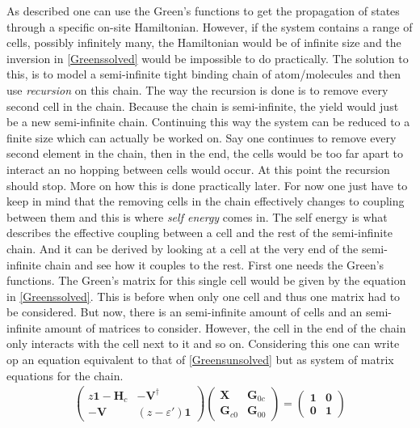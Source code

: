 As described  one can use the Green's functions to get the propagation of states through a specific on-site Hamiltonian. However, if the system contains a range of cells, possibly infinitely many, the Hamiltonian would be of infinite size and the inversion in \cref{Greenssolved} would be impossible to do practically. The solution to this, is to model a semi-infinite tight binding chain of atom/molecules and then use \textit{recursion} on this chain. The way the recursion is done is to remove every second cell in the chain. Because the chain is semi-infinite, the yield would just be a new semi-infinite chain. Continuing this way the system can be reduced to a finite size which can actually be worked on. Say one continues to remove every second element in the chain, then in the end, the cells would be too far apart to interact an no hopping between cells would occur. At this point the recursion should stop. More on how this is done practically later.  For now one just have to keep in mind that the removing cells in the chain effectively changes to coupling between them and this is where \textit{self energy} comes in. The self energy is what describes the effective coupling between a cell and the rest of the semi-infinite chain. And it can be derived by looking at a cell at the very end of the semi-infinite chain and see how it couples to the rest. First one needs the Green's functions. The Green's matrix for this single cell would be given by the equation in \cref{Greenssolved}. This is before when only one cell and thus one matrix had to be considered. But now, there is an semi-infinite amount of cells and an semi-infinite amount of matrices to consider. However, the cell in the end of the chain only interacts with the cell next to it and so on. Considering this one can write op an equation equivalent to that of \cref{Greensunsolved} but as system of matrix equations for the chain.
\begin{align}\label{Greenssystem}
	\begin{pmatrix}
		z\mathbf{1}-\mathbf{H}_c & -\mathbf{V}^{\dagger} \\ -\mathbf{V} & (z-\varepsilon')\mathbf{1}
	\end{pmatrix}
	\begin{pmatrix}
		\mathbf{X}      & \mathbf{G}_{0c} \\
		\mathbf{G}_{c0} & \mathbf{G}_{00}
	\end{pmatrix}
	=
	\begin{pmatrix}
		\mathbf{1} & \mathbf{0} \\
		\mathbf{0} & \mathbf{1}
	\end{pmatrix}
\end{align}
